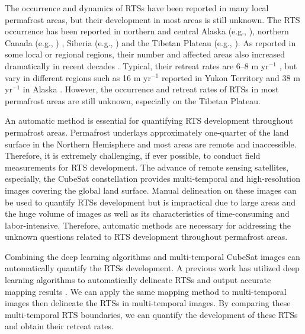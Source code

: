 \documentclass[authoryear,preprint,review,12pt]{elsarticle}
\begin{document}
The occurrence and dynamics of RTSs have been reported in many local permafrost areas, but their development in most areas is still unknown. 
The RTS occurrence has been reported in northern and central Alaska (e.g., \citealp{swanson2018growth,balser2014timing}), northern Canada (e.g., \citealp{burn1990canadian, cassidy2017impacts, armstrong2018thaw,lewkowicz2019extremes}) , Siberia (e.g., \citealp{leibman2003dynamics, zwieback2018sub}) and the Tibetan Plateau (e.g., \citealp{niu2005engineering, niu2016thaw}). 
As reported in some local or regional regions, their number and affected areas also increased dramatically in recent decades \citep{luo2019recent, lewkowicz2019extremes}.
Typical, their retreat rates are 6--8 m yr$^{-1}$ \citep{jorgenson_thermokarst_2013}, but vary in different regions such as 16 m yr$^{-1}$ reported in Yukon Territory \citep{burn1989geomorphology} and 38 m yr$^{-1}$  in Alaska \citep{swanson2018growth}.
However, the occurrence and retreat rates of RTSs in most permafrost areas are still unknown, especially on the Tibetan Plateau. 

An automatic method is essential for quantifying RTS development throughout permafrost areas. 
Permafrost underlays approximately one-quarter of the land surface in the Northern Hemisphere \citep{zhang1999statistics} and most areas are remote and inaccessible. 
Therefore, it is extremely challenging, if ever possible, to conduct field measurements for RTS development. 
The advance of remote sensing satellites, especially, the CubeSat constellation provides multi-temporal and high-resolution images covering the global land surface. 
Manual delineation on these images can be used to quantify RTSs development but is impractical due to large areas and the huge volume of images as well as its characteristics of time-consuming and labor-intensive. 
Therefore, automatic methods are necessary for addressing the unknown questions related to RTS development throughout permafrost areas. 


Combining the deep learning algorithms and multi-temporal CubeSat images can automatically quantify the RTSs development.
A previous work has utilized deep learning algorithms to automatically delineate RTSs and output accurate mapping results \citep{huang2020using}. 
We can apply the same mapping method to multi-temporal images then delineate the RTSs in multi-temporal images. 
By comparing these multi-temporal RTS boundaries, we can quantify the development of these RTSs and obtain their retreat rates. 
\end{document}
